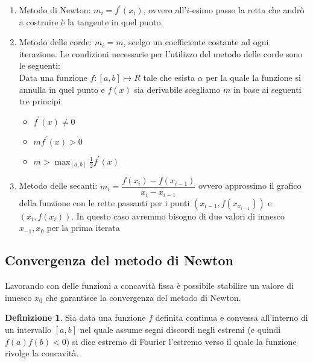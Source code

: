 \documentclass[12pt, a4paper]{book}
\theoremstyle{definition}
\newtheorem{defn}{Definizione}[section]
\begin{document}
\begin{flushleft}
\begin{enumerate}
	\item Metodo di Newton: $m_{i} = f^{'}(x_{i})$,  ovvero all'$i$-esimo passo la retta che andrò a costruire è la tangente in quel punto. 
	\item Metodo delle corde: $m_{i} = m$,  scelgo un coefficiente costante ad ogni iterazione.  Le condizioni necessarie per l'utilizzo del metodo delle corde sono le seguenti: \\
	Data una funzione $f:[a,b] \mapsto R$ tale che esista $\alpha$ per la quale la funzione si annulla in quel punto e $f(x)$ sia derivabile scegliamo $m$ in base ai seguenti tre principi
	\begin{itemize}
		\item $f^{'}(x) \neq 0$
		\item $mf^{'}(x) > 0$
		\item $m > \max_{[a,b]} \frac{1}{2}f^{'}(x) $
	\end{itemize}
	\item Metodo delle secanti:  $m_{i} = \dfrac{f(x_{i}) - f(x_{i - 1})}{x_{i} - x_{i - 1}}$ ovvero approssimo il grafico della funzione con le rette passanti per i punti $(x_{i-1}, f(x_{x_{i-1}}))$ e $(x_{i}, f(x_{i}))$. In questo caso avremmo bisogno di due valori di innesco $x_{-1}, x_{0}$ per la prima iterata 
\end{enumerate}

\subsection{Convergenza del metodo di Newton}
Lavorando con delle funzioni a concavità fissa è possibile stabilire un valore di innesco $x_{0}$ che garantisce la convergenza del metodo di Newton.
\begin{defn}
Sia data una funzione $f$ definita continua e convessa all'interno di un intervallo $[a,b]$ nel quale assume segni discordi negli estremi (e quindi $f(a)f(b)<0$) si dice estremo di Fourier l'estremo verso il quale la funzione rivolge la concavità.
\end{defn}
\begin{figure}[h!]
    \centering
    \begin{minipage}{0.40\textwidth}
         \centering
\end{minipage}
\end{figure}
\end{flushleft}
\end{document}
